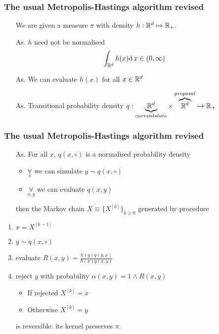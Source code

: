 \begin{frame}
		\frametitle{ The usual Metropolis-Hastings algorithm revised}

	\begin{itemize}
		\item[]	 We are given a measure $\pi$ with density $h: \mathbb{R}^d \mapsto \mathbb{R}_+$.
		\item[\textcolor{dkgreen}{As.}]  $h$ need not be normalised 
		 $$ \int_{\mathbb{R}^d} h(x) \mathrm{d}\, x \in (0, \infty) $$		
		\item[\textcolor{dkgreen}{As.}] We can evaluate $h(x)$ for all $x \in \mathbb{R}^d$  
		\item[\textcolor{dkgreen}{As.}] Transitional probability density $ q : \underbrace{\mathbb{R}^d}_{current state} \times \overbrace{\mathbb{R}^d}^{proposal} \mapsto \mathbb{R}_+$ 
	\end{itemize}
\end{frame}


\begin{frame}
		\frametitle{ The usual Metropolis-Hastings algorithm revised}

	\begin{itemize}
		\item[\textcolor{dkgreen}{As.}]	 For all $x$, $q(x, \circ)$ is a normalised probability density
		\begin{itemize}
			\item $ \underset{x}{\forall} $ we can simulate $y  \sim q(x, \circ)$
			\item $ \underset{x,y}{\forall} $ we can evaluate $q(x,y)$
		\end{itemize}
		\item[] then the Markov chain $X \equiv \{ X^{[k]}\}_{k \geq 0}$ generated by procedure
	\end{itemize}

	\begin{enumerate}	
		\item $ x = X^{[k-1]}$
		\item $y  \sim q(x, \circ)$
		\item evaluate $R(x,y) = \frac{h(y)q(y,x)}{h(x)q(x,y)}$
		\item reject $y$ with probability $\alpha(x,y) = 1 \wedge R(x,y)$
		\begin{itemize}
			\item If rejected $X^{[k]} = x$
			\item Otherwise $X^{[k]} = y$
		\end{itemize}
	\end{enumerate}

	\begin{itemize}
		\item[] is reversible: its kernel preserves $\pi$.
	\end{itemize}
	
	
\end{frame}


